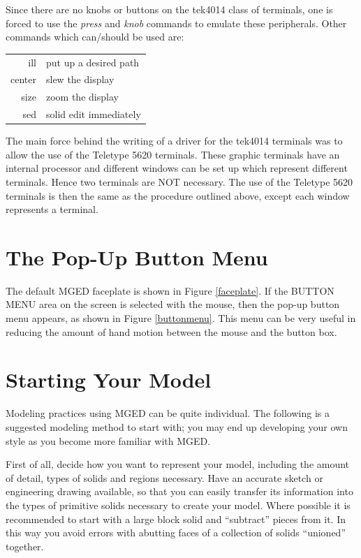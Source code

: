 Since there are no knobs or buttons on the tek4014 class of terminals, one
is forced to use the {\em press} and {\em knob} commands to emulate these
peripherals.
Other commands which can/should be used are:

\begin{tabular}{rl}
ill     & put up a desired path \\
center  & slew the display \\
size    & zoom the display \\
sed     & solid edit immediately
\end{tabular}

The main force behind the writing of a driver for the tek4014 terminals
was to allow the use of the Teletype 5620 terminals.
These graphic terminals have an internal processor and different windows
can be set up which represent different terminals.
Hence two terminals are NOT necessary.
The use of the Teletype 5620 terminals is then the same as the procedure
outlined above, except each window represents a terminal.

\section{The Pop-Up Button Menu}

The default MGED faceplate is shown in Figure \ref{faceplate}.
If the BUTTON MENU area on the screen is selected with the mouse,
then the pop-up button menu appears, as shown in Figure \ref{buttonmenu}.
This menu can be very useful in reducing the amount of hand motion
between the mouse and the button box.

\section{Starting Your Model}

Modeling practices using MGED can be quite individual.  The following is a
suggested modeling method to start with; you may end up developing your own
style as you become more familiar with MGED.

First of all, decide how you want to represent your model, including the
amount of detail, types of solids and regions necessary.  Have an accurate
sketch or engineering drawing available, so that you can easily transfer its
information into the types of primitive solids necessary to create your model.
Where possible it is recommended to start with a large block solid and
``subtract'' pieces from it.  In this way you avoid errors with abutting
faces of a collection of solids ``unioned'' together.

